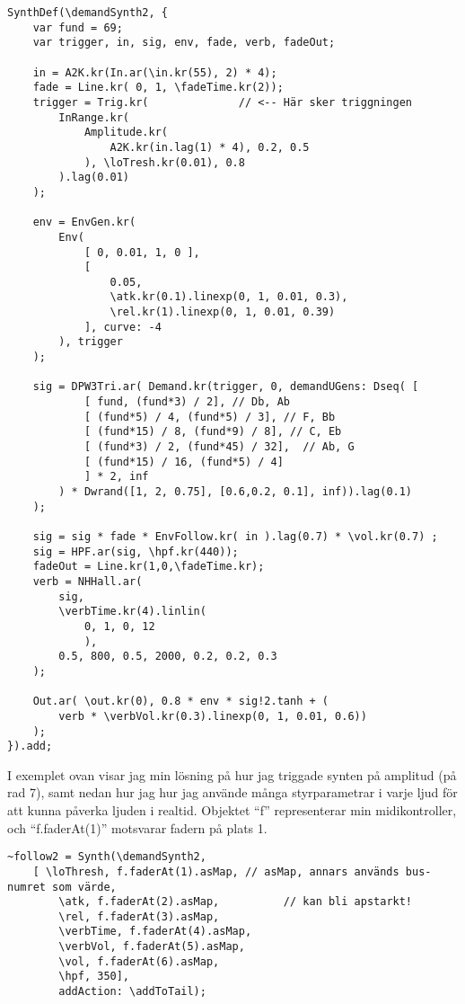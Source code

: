 \documentclass{article}
\renewcommand{\baselinestretch}{1.5}
\begin{document}
\renewcommand{\baselinestretch}{1}
\begin{lstlisting}[style=SuperCollider-IDE, caption=Amplitudtriggad synt]
SynthDef(\demandSynth2, {
	var fund = 69;
	var trigger, in, sig, env, fade, verb, fadeOut;

	in = A2K.kr(In.ar(\in.kr(55), 2) * 4);
	fade = Line.kr( 0, 1, \fadeTime.kr(2));
	trigger = Trig.kr(			    // <-- Här sker triggningen
		InRange.kr( 
			Amplitude.kr(
				A2K.kr(in.lag(1) * 4), 0.2, 0.5
			), \loTresh.kr(0.01), 0.8 
		).lag(0.01)
	);

	env = EnvGen.kr(
		Env( 
			[ 0, 0.01, 1, 0 ],
			[
				0.05,
				\atk.kr(0.1).linexp(0, 1, 0.01, 0.3),
				\rel.kr(1).linexp(0, 1, 0.01, 0.39) 
			], curve: -4
		), trigger
	);

	sig = DPW3Tri.ar( Demand.kr(trigger, 0, demandUGens: Dseq( [ 
			[ fund, (fund*3) / 2], // Db, Ab
			[ (fund*5) / 4, (fund*5) / 3], // F, Bb
			[ (fund*15) / 8, (fund*9) / 8], // C, Eb
			[ (fund*3) / 2, (fund*45) / 32],  // Ab, G
			[ (fund*15) / 16, (fund*5) / 4]
			] * 2, inf
		) * Dwrand([1, 2, 0.75], [0.6,0.2, 0.1], inf)).lag(0.1)
	);

	sig = sig * fade * EnvFollow.kr( in ).lag(0.7) * \vol.kr(0.7) ;
	sig = HPF.ar(sig, \hpf.kr(440));
	fadeOut = Line.kr(1,0,\fadeTime.kr);
	verb = NHHall.ar(
		sig, 
		\verbTime.kr(4).linlin(
			0, 1, 0, 12
			), 
		0.5, 800, 0.5, 2000, 0.2, 0.2, 0.3
	);

	Out.ar( \out.kr(0), 0.8 * env * sig!2.tanh + ( 
		verb * \verbVol.kr(0.3).linexp(0, 1, 0.01, 0.6))
	);  
}).add;
\end{lstlisting}
\renewcommand{\baselinestretch}{1.5}


  I exemplet ovan visar jag min lösning på hur jag triggade synten på amplitud (på rad 7), samt nedan hur jag
  hur jag använde många styrparametrar i varje ljud för att kunna påverka ljuden i realtid. Objektet ``f''
  representerar min midikontroller, och ``f.faderAt(1)'' motsvarar fadern på plats 1.


\renewcommand{\baselinestretch}{1}
\begin{lstlisting}[style=SuperCollider-IDE, caption=Syntens kontrollschema]
~follow2 = Synth(\demandSynth2, 
	[ \loThresh, f.faderAt(1).asMap, // asMap, annars används bus-numret som värde,
		\atk, f.faderAt(2).asMap,		   // kan bli apstarkt!
		\rel, f.faderAt(3).asMap,
		\verbTime, f.faderAt(4).asMap,
		\verbVol, f.faderAt(5).asMap,
		\vol, f.faderAt(6).asMap,
		\hpf, 350],
		addAction: \addToTail); 
\end{lstlisting}
\renewcommand{\baselinestretch}{1.5}
\end{document}
